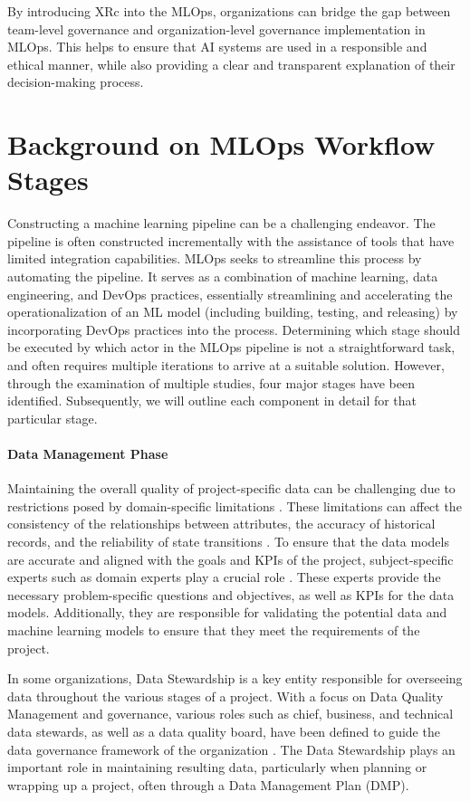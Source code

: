 \documentclass[conference]{IEEEtran}
\begin{document}
By introducing XRc into the MLOps, organizations can bridge the gap between team-level governance and organization-level governance implementation in MLOps. This helps to ensure that AI systems are used in a responsible and ethical manner, while also providing a clear and transparent explanation of their decision-making process.

\section{Background on MLOps Workflow Stages}
Constructing a machine learning pipeline can be a challenging endeavor. The pipeline is often constructed incrementally with the assistance of tools that have limited integration capabilities. MLOps seeks to streamline this process by automating the pipeline. It serves as a combination of machine learning, data engineering, and DevOps practices, essentially streamlining and accelerating the operationalization of an ML model (including building, testing, and releasing) by incorporating DevOps practices into the process. Determining which stage should be executed by which actor in the MLOps pipeline is not a straightforward task, and often requires multiple iterations to arrive at a suitable solution. However, through the examination of multiple studies, four major stages have been identified. Subsequently, we will outline each component in detail for that particular stage.
\paragraph{Data Management Phase} Maintaining the overall quality of project-specific data can be challenging due to restrictions posed by domain-specific limitations \cite{maydanchik2007data}. These limitations can affect the consistency of the relationships between attributes, the accuracy of historical records, and the reliability of state transitions \cite{taleb2018big}. To ensure that the data models are accurate and aligned with the goals and KPIs of the project, subject-specific experts such as domain experts play a crucial role . These experts provide the necessary problem-specific questions and objectives, as well as KPIs for the data models. Additionally, they are responsible for validating the potential data and machine learning models to ensure that they meet the requirements of the project.

In some organizations, Data Stewardship is a key entity responsible for overseeing data throughout the various stages of a project. With a focus on Data Quality Management and governance, various roles such as chief, business, and technical data stewards, as well as a data quality board, have been defined to guide the data governance framework of the organization \cite{mons2018data}. The Data Stewardship plays an important role in maintaining resulting data, particularly when planning or wrapping up a project, often through a Data Management Plan (DMP).
\end{document}
